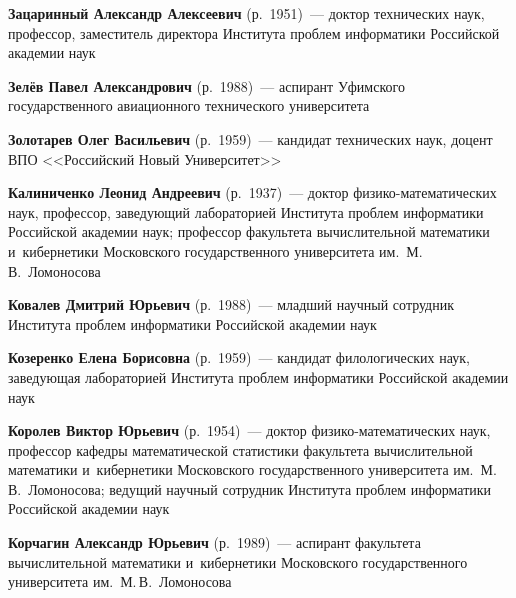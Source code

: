 \begin{multicols}{2}
\noindent
\textbf{Зацаринный Александр Алексеевич} (р.\ 1951)~---
доктор технических наук, профессор, заместитель директора Института
проблем информатики Российской академии наук

\vspace*{2pt}

\noindent
\textbf{Зелёв Павел Александрович} (р.\ 1988)~---
аспирант  Уфимского  государственного авиационного технического университета

\columnbreak

\noindent
\textbf{Золотарев Олег Васильевич} (р.\ 1959)~---
кандидат технических наук, доцент ВПО <<Российский Новый Университет>>


\vspace*{2pt}


\noindent
\textbf{Калиниченко Леонид Андреевич} (р.\ 1937)~---
доктор фи\-зи\-ко-ма\-те\-ма\-ти\-че\-ских наук, профессор, заведующий
лабораторией Института проблем информатики Российской академии наук;
профессор факульте\-та вычислительной математики и~кибернетики Московского
государственного университета им.\ М.\,В.~Ломоносова


\vspace*{2pt}

\noindent
\textbf{Ковалев Дмитрий Юрьевич} (р.\ 1988)~---
младший научный сотрудник Института проблем информатики Российской академии наук


\vspace*{2pt}

\noindent
\textbf{Козеренко Елена Борисовна} (р.\ 1959)~---
кандидат филологических наук, заведующая лабораторией Института
проблем информатики Российской академии наук

\vspace*{2pt}

\noindent
\textbf{Королев Виктор Юрьевич} (р.\ 1954)~---
доктор фи\-зи\-ко-ма\-те\-ма\-ти\-че\-ских наук, профессор кафедры
математической статистики факультета вычислительной математики
и~кибернетики Московского государ\-ст\-венного университета им.\ М.\,В.~Ломоносова;
ведущий научный сотрудник Института проблем информатики Российской академии наук

\vspace*{2pt}

\noindent
\textbf{Корчагин Александр Юрьевич} (р.\ 1989)~---
аспирант факультета вычислительной математики и~кибернетики Московского
государственного университета им.\ М.\,В.~Ломоносова


\end{multicols}
